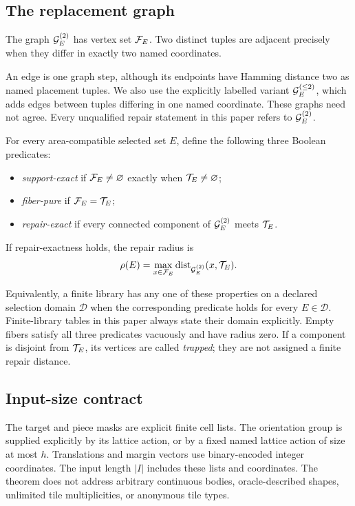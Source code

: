 \subsection{The replacement graph}

\begin{definition}\label{def:graph}
The graph \(\mathcal G_E^{(2)}\) has vertex set \(\mathcal F_E\).  Two distinct tuples
are adjacent precisely when they differ in exactly two named coordinates.
\end{definition}

An edge is one graph step, although its endpoints have Hamming distance two
as named placement tuples.  We also use the explicitly labelled variant
\(\mathcal G_E^{(\leq2)}\), which adds edges between tuples differing in one named
coordinate.  These graphs need not agree.  Every unqualified repair
statement in this paper refers to \(\mathcal G_E^{(2)}\).

\begin{definition}\label{def:predicates}
For every area-compatible selected set \(E\), define the following three
Boolean predicates:
\begin{itemize}
  \item \emph{support-exact} if
        \(\mathcal F_E\neq\varnothing\) exactly when
        \(\mathcal T_E\neq\varnothing\);
  \item \emph{fiber-pure} if \(\mathcal F_E=\mathcal T_E\);
  \item \emph{repair-exact} if every connected component of
        \(\mathcal G_E^{(2)}\) meets \(\mathcal T_E\).
\end{itemize}
If repair-exactness holds, the repair radius is
\[
  \rho(E)=\max_{x\in\mathcal F_E}\operatorname{dist}_{\mathcal G_E^{(2)}}(x,\mathcal T_E).
\]
\end{definition}

Equivalently, a finite library has any one of these properties on a declared
selection domain \(\mathcal D\) when the corresponding predicate holds for
every \(E\in\mathcal D\).  Finite-library tables in this paper always state
their domain explicitly.  Empty fibers satisfy all three predicates
vacuously and have radius zero.
If a component is disjoint from \(\mathcal T_E\), its vertices are called
\emph{trapped}; they are not assigned a finite repair distance.

\subsection{Input-size contract}

The target and piece masks are explicit finite cell lists.  The orientation
group is supplied explicitly by its lattice action, or by a fixed named
lattice action of size at most \(h\).
Translations and margin vectors use binary-encoded integer coordinates.
The input length \(|I|\) includes these lists and coordinates.  The theorem
does not address arbitrary continuous bodies, oracle-described shapes,
unlimited tile multiplicities, or anonymous tile types.
